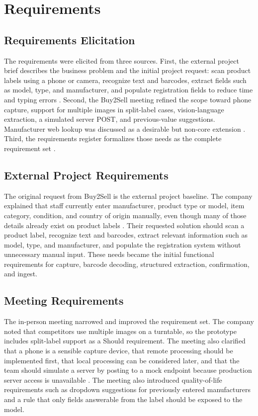 \chapter{Requirements}
\label{chap:requirements}

\section{Requirements Elicitation}

The requirements were elicited from three sources. First, the external project brief describes the business problem and the initial project request: scan product labels using a phone or camera, recognize text and barcodes, extract fields such as model, type, and manufacturer, and populate registration fields to reduce time and typing errors \cite{buy2sell-brief}. Second, the Buy2Sell meeting refined the scope toward phone capture, support for multiple images in split-label cases, vision-language extraction, a simulated server POST, and previous-value suggestions. Manufacturer web lookup was discussed as a desirable but non-core extension \cite{meeting-notes}. Third, the requirements register formalizes those needs as the complete requirement set \cite{requirements-register}.

\section{External Project Requirements}

The original request from Buy2Sell is the external project baseline. The company explained that staff currently enter manufacturer, product type or model, item category, condition, and country of origin manually, even though many of those details already exist on product labels \cite{buy2sell-brief}. Their requested solution should scan a product label, recognize text and barcodes, extract relevant information such as model, type, and manufacturer, and populate the registration system without unnecessary manual input. These needs became the initial functional requirements for capture, barcode decoding, structured extraction, confirmation, and ingest.

\section{Meeting Requirements}

The in-person meeting narrowed and improved the requirement set. The company noted that competitors use multiple images on a turntable, so the prototype includes split-label support as a Should requirement. The meeting also clarified that a phone is a sensible capture device, that remote processing should be implemented first, that local processing can be considered later, and that the team should simulate a server by posting to a mock endpoint because production server access is unavailable \cite{meeting-notes}. The meeting also introduced quality-of-life requirements such as dropdown suggestions for previously entered manufacturers and a rule that only fields answerable from the label should be exposed to the model.

